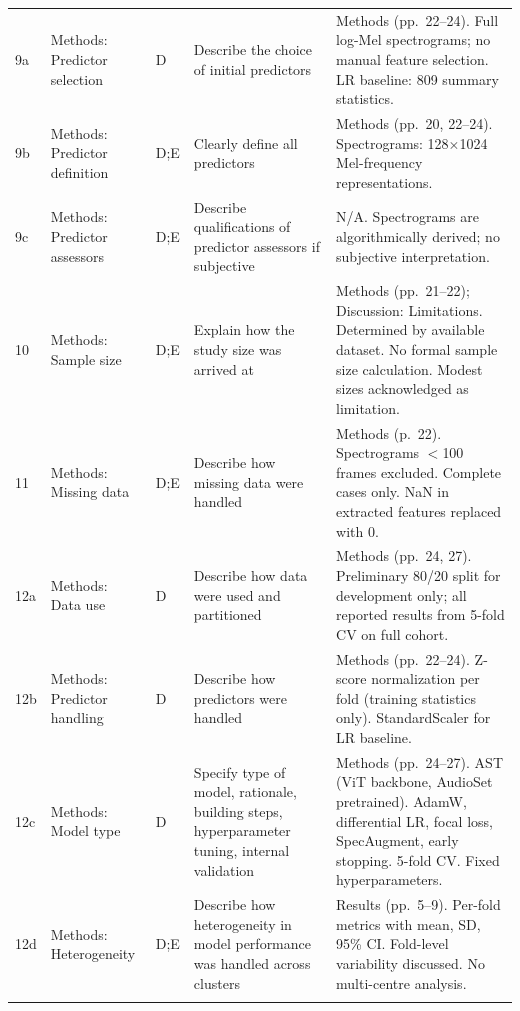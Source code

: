 \documentclass[11pt,a4paper]{article}
\begin{document}
{\begin{longtable}{C{0.6cm} L{2.2cm} C{0.6cm} L{5.5cm} L{4.5cm}}
9a & Methods: Predictor selection & D & Describe the choice of initial predictors & Methods (pp.~22--24). Full log-Mel spectrograms; no manual feature selection. LR baseline: 809 summary statistics. \\
\addlinespace

9b & Methods: Predictor definition & D;E & Clearly define all predictors & Methods (pp.~20, 22--24). Spectrograms: 128$\times$1024 Mel-frequency representations. \\
\addlinespace

9c & Methods: Predictor assessors & D;E & Describe qualifications of predictor assessors if subjective & N/A. Spectrograms are algorithmically derived; no subjective interpretation. \\
\addlinespace

10 & Methods: Sample size & D;E & Explain how the study size was arrived at & Methods (pp.~21--22); Discussion: Limitations. Determined by available dataset. No formal sample size calculation. Modest sizes acknowledged as limitation. \\
\addlinespace

11 & Methods: Missing data & D;E & Describe how missing data were handled & Methods (p.~22). Spectrograms $<$100 frames excluded. Complete cases only. NaN in extracted features replaced with 0. \\
\addlinespace

12a & Methods: Data use & D & Describe how data were used and partitioned & Methods (pp.~24, 27). Preliminary 80/20 split for development only; all reported results from 5-fold CV on full cohort. \\
\addlinespace

12b & Methods: Predictor handling & D & Describe how predictors were handled & Methods (pp.~22--24). Z-score normalization per fold (training statistics only). StandardScaler for LR baseline. \\
\addlinespace

12c & Methods: Model type & D & Specify type of model, rationale, building steps, hyperparameter tuning, internal validation & Methods (pp.~24--27). AST (ViT backbone, AudioSet pretrained). AdamW, differential LR, focal loss, SpecAugment, early stopping. 5-fold CV. Fixed hyperparameters. \\
\addlinespace

12d & Methods: Heterogeneity & D;E & Describe how heterogeneity in model performance was handled across clusters & Results (pp.~5--9). Per-fold metrics with mean, SD, 95\% CI. Fold-level variability discussed. No multi-centre analysis. \\
\addlinespace


\end{longtable}}
\end{document}
